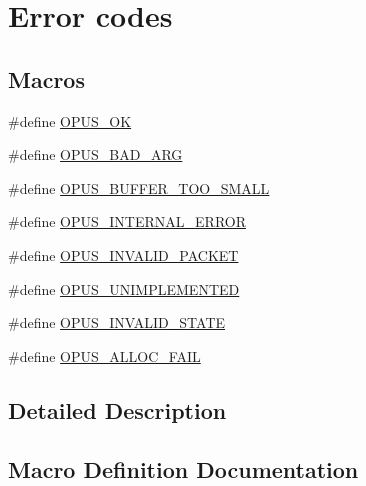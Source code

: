 \hypertarget{group__opus__errorcodes}{}\section{Error codes}
\label{group__opus__errorcodes}
\subsection*{Macros}
\begin{DoxyCompactItemize}
\item 
\#define \hyperlink{group__opus__errorcodes_gaa44cf8a185e1b5cb940ef63eb4f02d21}{O\+P\+U\+S\+\_\+\+OK}
\item 
\#define \hyperlink{group__opus__errorcodes_gaf2d43e479455a1a3b6874e5faf4e827d}{O\+P\+U\+S\+\_\+\+B\+A\+D\+\_\+\+A\+RG}
\item 
\#define \hyperlink{group__opus__errorcodes_gacd897c05563ec04a67d8e92ba29f3d4f}{O\+P\+U\+S\+\_\+\+B\+U\+F\+F\+E\+R\+\_\+\+T\+O\+O\+\_\+\+S\+M\+A\+LL}
\item 
\#define \hyperlink{group__opus__errorcodes_gae1f952c366ebd380df9efa1842635a0b}{O\+P\+U\+S\+\_\+\+I\+N\+T\+E\+R\+N\+A\+L\+\_\+\+E\+R\+R\+OR}
\item 
\#define \hyperlink{group__opus__errorcodes_ga46fc9dd493fb8e291bd8e838f0988bb7}{O\+P\+U\+S\+\_\+\+I\+N\+V\+A\+L\+I\+D\+\_\+\+P\+A\+C\+K\+ET}
\item 
\#define \hyperlink{group__opus__errorcodes_ga3b8d73b0f44b8b925ff40fd7c02b14a0}{O\+P\+U\+S\+\_\+\+U\+N\+I\+M\+P\+L\+E\+M\+E\+N\+T\+ED}
\item 
\#define \hyperlink{group__opus__errorcodes_ga54416ec79619179d688918f25e9b20e3}{O\+P\+U\+S\+\_\+\+I\+N\+V\+A\+L\+I\+D\+\_\+\+S\+T\+A\+TE}
\item 
\#define \hyperlink{group__opus__errorcodes_ga92fae6b1de2ac16b8d96561f9a8fb8b9}{O\+P\+U\+S\+\_\+\+A\+L\+L\+O\+C\+\_\+\+F\+A\+IL}
\end{DoxyCompactItemize}


\subsection{Detailed Description}


\subsection{Macro Definition Documentation}
\mbox{\label{group__opus__errorcodes_ga92fae6b1de2ac16b8d96561f9a8fb8b9}} 
